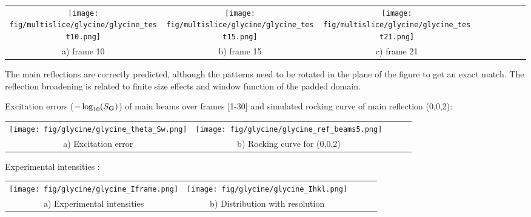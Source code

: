 \documentclass[a0paper,portrait,fontscale=0.34]{baposter}
\begin{document}
\begin{poster}
{\begin{multicols}{2}
	\begin{tabular}{@{}c@{ }c@{ }c@{ }c@{ }c@{ }c@{ }c@{ }c@{ }c@{ }}
		\texttt{[image: fig/multislice/glycine/glycine\_test10.png]}&
		\texttt{[image: fig/multislice/glycine/glycine\_test15.png]}&
		\texttt{[image: fig/multislice/glycine/glycine\_test21.png]}\\
			 a) frame 10 & \smaller b) frame 15 & \smaller c) frame 21
	\end{tabular}

\vspace{1em}
The main reflections are correctly predicted, although the patterns need to be rotated
in the plane of the figure to get an exact match. The reflection broadening is related to
finite size effects and window function of the padded domain.

Excitation errors ($-\log_{10}(S_{\mathbf G})$) of main beams over frames [1-30] and
simulated rocking curve of main reflection (0,0,2):

\begin{tabular}{@{}c@{ }c@{ }c@{ }c@{ }c@{ }}
	\hspace{1em}
	\texttt{[image: fig/glycine/glycine\_theta\_Sw.png]}&
	\texttt{[image: fig/glycine/glycine\_ref\_beams5.png]}\\
		 \smaller a) Excitation error & \smaller b) Rocking curve for (0,0,2)
\end{tabular}

\vspace{1em}
Experimental intensities :

\begin{tabular}{@{}c@{ }c@{ }c@{ }c@{ }c@{ }}
	\hspace{1em}
	\texttt{[image: fig/glycine/glycine\_Iframe.png]}&
	\texttt{[image: fig/glycine/glycine\_Ihkl.png]}\\
		\smaller a) Experimental intensities & \smaller b) Distribution with resolution
\end{tabular}

\end{multicols}

\vspace{0.2em}
}


\end{poster}
\end{document}
